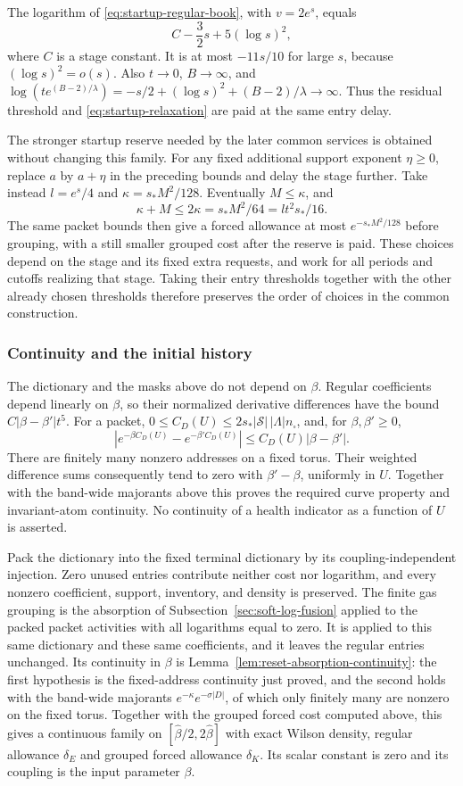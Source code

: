 The logarithm of \eqref{eq:startup-regular-book}, with
$v=2e^s$, equals
\[ C-\frac32s+5(\log s)^2, \]
where $C$ is a stage constant.
It is at most $-11s/10$ for large $s$, because
$(\log s)^2=o(s)$. Also $t\to0$, $B\to\infty$, and
$\log(t e^{(B-2)/\lambda})=-s/2+(\log s)^2+
(B-2)/\lambda\to\infty$. Thus the residual threshold and
\eqref{eq:startup-relaxation} are paid at the same entry delay.

The stronger startup reserve needed by the later common services
is obtained without changing this family. For any fixed additional
support exponent $\eta\ge0$, replace $a$ by $a+\eta$ in the
preceding bounds and delay the stage further. Take instead
$l=e^s/4$ and $\kappa=s_*M^2/128$. Eventually $M\le\kappa$,
and
\[
       \kappa+M\le2\kappa=s_*M^2/64=lt^2s_*/16.
\]
The same packet bounds then give a forced allowance at most
$e^{-s_*M^2/128}$ before grouping, with a still smaller
grouped cost after the reserve is paid. These choices depend on
the stage and its fixed extra requests, and work for all periods
and cutoffs realizing that stage. Taking their entry thresholds
together with the other already chosen thresholds therefore
preserves the order of choices in the common construction.

\subsubsection{Continuity and the initial history}
The dictionary and the masks above do not depend on $\beta$.
Regular coefficients depend linearly on $\beta$, so their
normalized derivative differences have the bound
$C|\beta-\beta'|t^5$. For a packet, $0\le C_D(U)\le
2s_*|\mathcal S|\,|\Lambda|n_\square$, and, for
$\beta,\beta'\ge0$,
\[
 |e^{-\beta C_D(U)}-e^{-\beta'C_D(U)}|
                         \le C_D(U)|\beta-\beta'|.
\]
There are finitely many nonzero addresses on a fixed torus.
Their weighted difference sums consequently tend to zero with
$\beta'-\beta$, uniformly in $U$. Together with the band-wide
majorants above this proves the required curve property and
invariant-atom continuity. No continuity of a health indicator
as a function of $U$ is asserted.

Pack the dictionary into the fixed terminal dictionary by its
coupling-independent injection. Zero unused entries contribute
neither cost nor logarithm, and every nonzero coefficient, support,
inventory, and density is preserved. The finite gas grouping is the
absorption of Subsection~\ref{sec:soft-log-fusion} applied to the packed
packet activities with all logarithms equal to zero. It is applied to
this same dictionary and these same coefficients, and it leaves the
regular entries unchanged. Its continuity in $\beta$ is
Lemma~\ref{lem:reset-absorption-continuity}: the first hypothesis is
the fixed-address continuity just proved, and the second holds with
the band-wide majorants $e^{-\kappa}e^{-\sigma|D|}$, of which only
finitely many are nonzero on the fixed torus. Together with the
grouped forced cost computed above, this gives a continuous family
on $[\widehat\beta/2,2\widehat\beta]$ with exact Wilson density,
regular allowance $\delta_E$ and grouped forced allowance
$\delta_K$. Its scalar constant is zero and its coupling is
the input parameter $\beta$.

